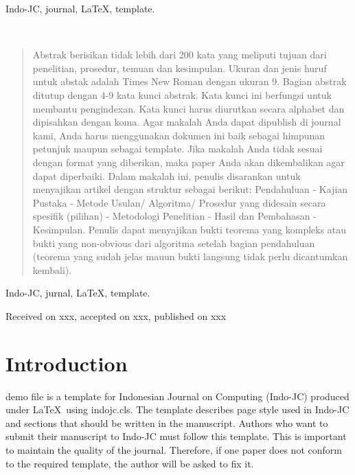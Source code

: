\documentclass[]{indojc_single}
\begin{document}
\begin{keywords}
Indo-JC, journal, \LaTeX, template.
\end{keywords}
$~$\\
\def\abstractname{Abstrak}
\def\keywordsname{Kata Kunci}
\begin{abstract}
Abstrak berisikan tidak lebih dari 200 kata yang meliputi tujuan dari penelitian, prosedur, temuan dan kesimpulan. Ukuran dan jenis huruf untuk abstak adalah Times New Roman dengan ukuran 9. Bagian abstrak ditutup dengan 4-9 kata kunci abstrak. Kata kunci ini berfungsi untuk membantu pengindexan. Kata kunci harus diurutkan secara alphabet dan dipisahkan dengan koma. Agar makalah Anda dapat dipublish di journal kami, Anda harus menggunakan dokumen ini baik sebagai himpunan petunjuk maupun sebagai template. Jika makalah Anda tidak sesuai dengan format yang diberikan, maka paper Anda akan dikembalikan agar dapat diperbaiki. Dalam makalah ini, penulis disarankan untuk menyajikan artikel dengan struktur sebagai berikut: Pendahuluan - Kajian Pustaka  - Metode Usulan/ Algoritma/ Prosedur yang didesain secara spesifik (pilihan) - Metodologi Penelitian - Hasil dan Pembahasan - Kesimpulan. Penulis dapat menyajikan bukti teorema yang kompleks atau bukti yang non-obvious dari algoritma setelah bagian pendahuluan (teorema yang sudah jelas mauun bukti langsung tidak perlu dicantumkan kembali).
\end{abstract}

\begin{keywords}
Indo-JC, jurnal, \LaTeX, template.
\end{keywords}


\begin{center}
\footnotesize Received on xxx, accepted on xxx, published on xxx
\end{center}

\section{Introduction}
 demo file is a template for Indonesian Journal on Computing (Indo-JC) produced under \LaTeX\ using indojc.cls. The template describes page style used in Indo-JC and sections that should be written in the manuscript. Authors who want to submit their manuscript to Indo-JC must follow this template. This is important to maintain the quality of the journal. Therefore, if one paper does not conform to the required template, the author will be asked to fix it.
\end{document}

